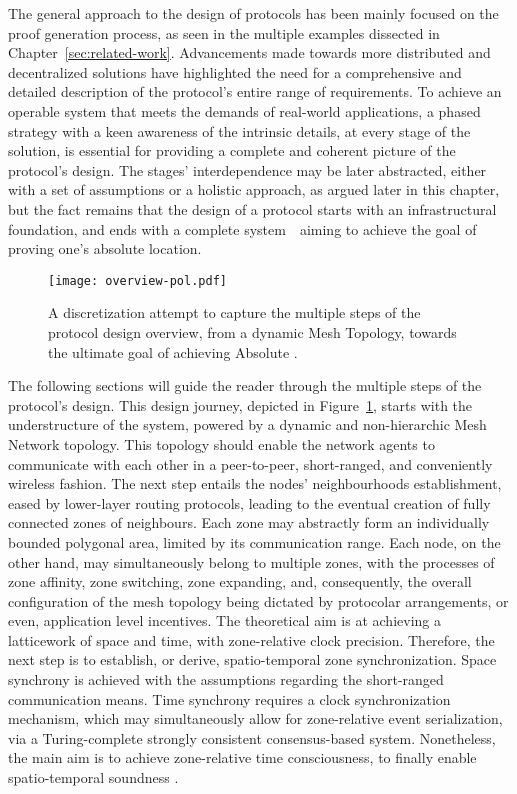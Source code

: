 The general approach to the design of \pol{} protocols has been mainly focused on the proof generation process, as seen in the multiple examples dissected in Chapter~\ref{sec:related-work}. Advancements made towards more distributed and decentralized solutions have highlighted the need for a comprehensive and detailed description of the protocol's entire range of requirements. To achieve an operable system that meets the demands of real-world applications, a phased strategy with a keen awareness of the intrinsic details, at every stage of the solution, is essential for providing a complete and coherent picture of the protocol's design. The stages' interdependence may be later abstracted, either with a set of assumptions or a holistic approach, as argued later in this chapter, but the fact remains that the design of a \pol{} protocol starts with an infrastructural foundation, and ends with a complete system~\textemdash~aiming to achieve the goal of proving one's absolute location.

\begin{figure}[ht]
    \begin{center}
    \texttt{[image: overview-pol.pdf]}
    \caption{A discretization attempt to capture the multiple steps of the protocol design overview, from a dynamic Mesh Topology, towards the ultimate goal of achieving Absolute \pol.}
    \label{fig:proof-of-location-overview}
    \end{center}
\end{figure}

The following sections will guide the reader through the multiple steps of the protocol's design. This design journey, depicted in Figure~\ref{fig:proof-of-location-overview}, starts with the understructure of the system, powered by a dynamic and non-hierarchic Mesh Network topology. This topology should enable the network agents to communicate with each other in a peer-to-peer, short-ranged, and conveniently wireless fashion. The next step entails the nodes' neighbourhoods establishment, eased by lower-layer routing protocols, leading to the eventual creation of fully connected zones of neighbours. Each zone may abstractly form an individually bounded polygonal area, limited by its communication range. Each node, on the other hand, may simultaneously belong to multiple zones, with the processes of zone affinity, zone switching, zone expanding, and, consequently, the overall configuration of the mesh topology being dictated by protocolar arrangements, or even, application level incentives. The theoretical aim is at achieving a latticework of space and time, with zone-relative clock precision. Therefore, the next step is to establish, or derive, spatio-temporal zone synchronization. Space synchrony is achieved with the assumptions regarding the short-ranged communication means. Time synchrony requires a clock synchronization mechanism, which may simultaneously allow for zone-relative event serialization, via a Turing-complete strongly consistent consensus-based system. Nonetheless, the main aim is to achieve zone-relative time consciousness, to finally enable spatio-temporal soundness \cite{nasrulin2018robust}.

